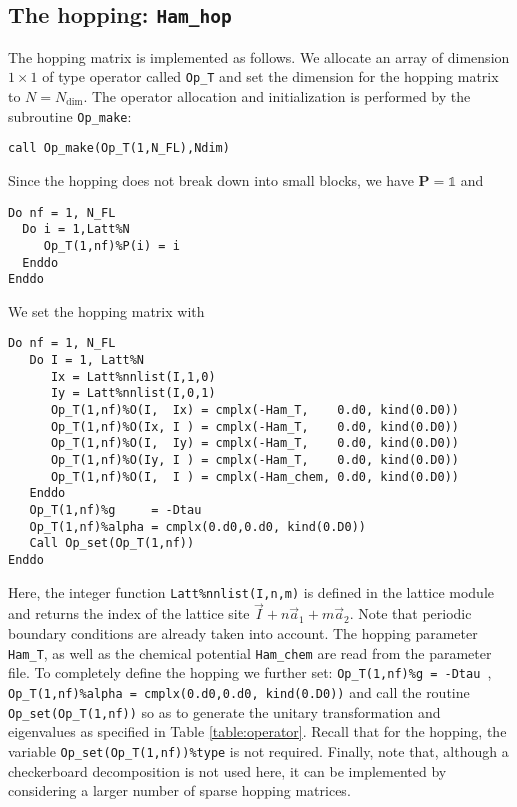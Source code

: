 \subsection{The hopping: \texttt{Ham\_hop}} \label{U_PV_Ham_hop}

The hopping matrix is implemented as follows. 
We allocate an array of dimension $1\times 1$ of type operator  called \texttt{Op\_T} and set the  dimension for the hopping  matrix to $N=N_{\mathrm{dim}}$. The operator allocation and initialization is performed by the subroutine \texttt{Op\_make}: 
\begin{lstlisting}[style=fortran]
call Op_make(Op_T(1,N_FL),Ndim)
\end{lstlisting}
Since the hopping  does not  break down into small blocks, we have ${\bm P}=\mathds{1}$   and  
\begin{lstlisting}[style=fortran]
Do nf = 1, N_FL
  Do i = 1,Latt%N
     Op_T(1,nf)%P(i) = i
  Enddo
Enddo
\end{lstlisting}
We set the hopping matrix  with 
\begin{lstlisting}[style=fortran]
Do nf = 1, N_FL
   Do I = 1, Latt%N
      Ix = Latt%nnlist(I,1,0)
      Iy = Latt%nnlist(I,0,1)
      Op_T(1,nf)%O(I,  Ix) = cmplx(-Ham_T,    0.d0, kind(0.D0))
      Op_T(1,nf)%O(Ix, I ) = cmplx(-Ham_T,    0.d0, kind(0.D0))
      Op_T(1,nf)%O(I,  Iy) = cmplx(-Ham_T,    0.d0, kind(0.D0))
      Op_T(1,nf)%O(Iy, I ) = cmplx(-Ham_T,    0.d0, kind(0.D0))
      Op_T(1,nf)%O(I,  I ) = cmplx(-Ham_chem, 0.d0, kind(0.D0))
   Enddo
   Op_T(1,nf)%g     = -Dtau
   Op_T(1,nf)%alpha = cmplx(0.d0,0.d0, kind(0.D0))
   Call Op_set(Op_T(1,nf))
Enddo
\end{lstlisting}
Here, the integer function \texttt{Latt\%nnlist(I,n,m)} is defined in the lattice module and returns the index of the lattice site $ \vec{I} +  n \vec{a}_1 +  m \vec{a}_2$.
Note that periodic boundary conditions are 
already taken into account.  The hopping parameter \texttt{Ham\_T}, as well as the chemical potential \texttt{Ham\_chem} are read from the parameter file.  
To completely define the hopping  we further set: \texttt{Op\_T(1,nf)\%g = -Dtau }, \texttt{Op\_T(1,nf)\%alpha = cmplx(0.d0,0.d0, kind(0.D0))} and call the routine  \texttt{Op\_set(Op\_T(1,nf))}  so as to generate  the unitary transformation and eigenvalues as specified in Table \ref{table:operator}.  Recall that for the hopping, the variable  \texttt{Op\_set(Op\_T(1,nf))\%type} is not required. 
Finally, note that, although a checkerboard decomposition is not used here, it can be implemented by considering a larger number of sparse hopping matrices.  


